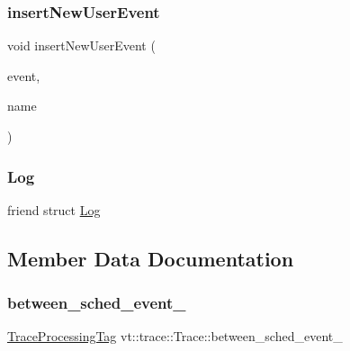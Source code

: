 \subsubsection{\texorpdfstring{insert\+New\+User\+Event}{insertNewUserEvent}}
{\footnotesize\ttfamily void insert\+New\+User\+Event (\begin{DoxyParamCaption}\item[{\hyperlink{namespacevt_1_1trace_a5908920d051c144c89f17c69ed262350}{User\+Event\+I\+D\+Type}}]{event,  }\item[{std\+::string const \&}]{name }\end{DoxyParamCaption})\hspace{0.3cm}{\ttfamily [friend]}}

\mbox{\label{structvt_1_1trace_1_1_trace_add132ae9df1b7ef820c8082c32b0f839}} 
\subsubsection{\texorpdfstring{Log}{Log}}
{\footnotesize\ttfamily friend struct \hyperlink{structvt_1_1trace_1_1_log}{Log}\hspace{0.3cm}{\ttfamily [friend]}}



\subsection{Member Data Documentation}
\mbox{\label{structvt_1_1trace_1_1_trace_a3fdadda342771b037bb85aa77e0fc9cb}} 
\subsubsection{\texorpdfstring{between\+\_\+sched\+\_\+event\+\_\+}{between\_sched\_event\_}}
{\footnotesize\ttfamily \hyperlink{structvt_1_1trace_1_1_trace_processing_tag}{Trace\+Processing\+Tag} vt\+::trace\+::\+Trace\+::between\+\_\+sched\+\_\+event\+\_\+\hspace{0.3cm}{\ttfamily [private]}}

